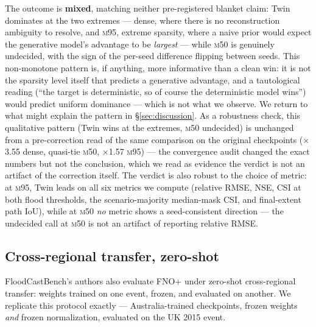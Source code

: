 \documentclass[11pt]{article}
\newcommand{\twin}{\mbox{Twin}}                 %
\newcommand{\mfifty}{\textsc{m50}}
\newcommand{\mninetyfive}{\textsc{m95}}
\begin{document}
The outcome is \textbf{mixed}, matching neither pre-registered blanket
claim: \twin{} dominates at the two extremes --- dense, where there is no
reconstruction ambiguity to resolve, and \mninetyfive{}, extreme sparsity,
where a naive prior would expect the generative model's advantage to be
\emph{largest} --- while \mfifty{} is genuinely undecided, with the sign
of the per-seed difference flipping between seeds. This non-monotone
pattern is, if anything, more informative than a clean win: it is not the
sparsity level itself that predicts a generative advantage, and a
tautological reading (``the target is deterministic, so of course the
deterministic model wins'') would predict uniform dominance --- which is
not what we observe. We return to what might explain the pattern in
\S\ref{sec:discussion}. As a robustness check, this qualitative pattern
(\twin{} wins at the extremes, \mfifty{} undecided) is unchanged from a
pre-correction read of the same comparison on the original checkpoints
($\times$3.55 dense, quasi-tie \mfifty{}, $\times$1.57 \mninetyfive{})
--- the convergence audit changed the exact numbers but not the
conclusion, which we read as evidence the verdict is not an artifact of
the correction itself. The verdict is also robust to the choice of
metric: at \mninetyfive{}, \twin{} leads on all six metrics we compute
(relative RMSE, NSE, CSI at both flood thresholds, the scenario-majority
median-mask CSI, and final-extent path IoU), while at \mfifty{} \emph{no}
metric shows a seed-consistent direction --- the undecided call at
\mfifty{} is not an artifact of reporting relative RMSE.
\FloatBarrier

\subsection{Cross-regional transfer, zero-shot}
\label{sec:zeroshot}
FloodCastBench's authors also evaluate FNO+ under zero-shot cross-regional
transfer: weights trained on one event, frozen, and evaluated on another.
We replicate this protocol exactly --- Australia-trained checkpoints,
frozen weights \emph{and} frozen normalization, evaluated on the UK 2015
event.
\end{document}
